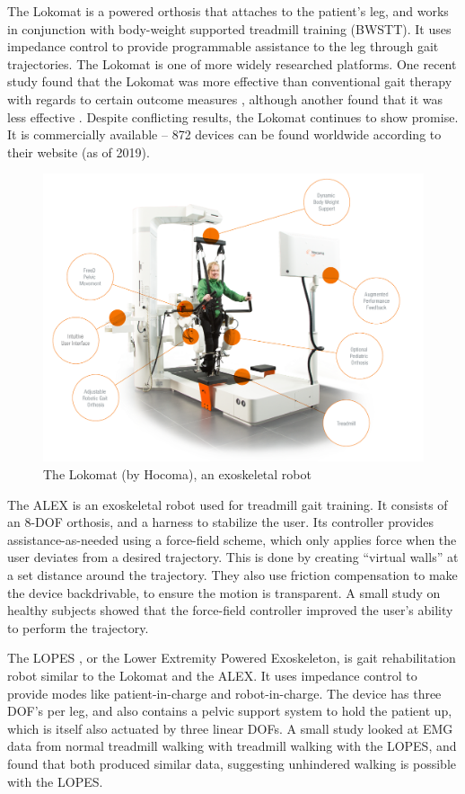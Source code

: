 \documentclass[12pt]{report}
\begin{document}
	The Lokomat is a powered orthosis that attaches to the patient's leg, and works in conjunction with body-weight supported treadmill training (BWSTT). It uses impedance control to provide programmable assistance to the leg through gait trajectories. The Lokomat is one of more widely researched platforms. One recent study found that the Lokomat was more effective than conventional gait therapy with regards to certain outcome measures \cite{Nam2017}, although another found that it was less effective \cite{Hidler2008}. Despite conflicting results, the Lokomat continues to show promise. It is commercially available -- 872 devices can be found worldwide according to their website (as of 2019).
			
	\begin{figure}[h] 
		\centering
		\includegraphics[width=0.75\linewidth]{Lokomat}
		\caption{The Lokomat (by Hocoma), an exoskeletal robot}
		\label{fig:Lokomat}
	\end{figure}
	
	The ALEX \cite{Banala2007} is an exoskeletal robot used for treadmill gait training. It consists of an 8-DOF orthosis, and a harness to stabilize the user. Its controller provides assistance-as-needed using a force-field scheme, which only applies force when the user deviates from a desired trajectory. This is done by creating ``virtual walls'' at a set distance around the trajectory. They also use friction compensation to make the device backdrivable, to ensure the motion is transparent. A small study on healthy subjects showed that the force-field controller improved the user's ability to perform the trajectory. 
	
	The LOPES \cite{Veneman2007}, or the Lower Extremity Powered Exoskeleton, is gait rehabilitation robot similar to the Lokomat and the ALEX. It uses impedance control to provide modes like patient-in-charge and robot-in-charge. The device has three DOF's per leg, and also contains a pelvic support system to hold the patient up, which is itself also actuated by three linear DOFs. A small study looked at EMG data from normal treadmill walking with treadmill walking with the LOPES, and found that both produced similar data, suggesting unhindered walking is possible with the LOPES.
	
\end{document}
